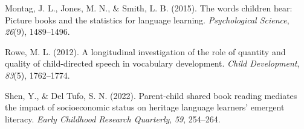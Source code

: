 \documentclass[10pt, letterpaper]{article}
\newenvironment{CSLReferences}%
  {}%
  {\par}
\begin{document}
\begin{CSLReferences}{1}{0}
\leavevmode{}%
Montag, J. L., Jones, M. N., \& Smith, L. B. (2015). The words children
hear: Picture books and the statistics for language learning.
\emph{Psychological Science}, \emph{26}(9), 1489--1496.

\leavevmode{}%
Rowe, M. L. (2012). A longitudinal investigation of the role of quantity
and quality of child-directed speech in vocabulary development.
\emph{Child Development}, \emph{83}(5), 1762--1774.

\leavevmode{}%
Shen, Y., \& Del Tufo, S. N. (2022). Parent-child shared book reading
mediates the impact of socioeconomic status on heritage language
learners' emergent literacy. \emph{Early Childhood Research Quarterly},
\emph{59}, 254--264.

\end{CSLReferences}


\end{document}
